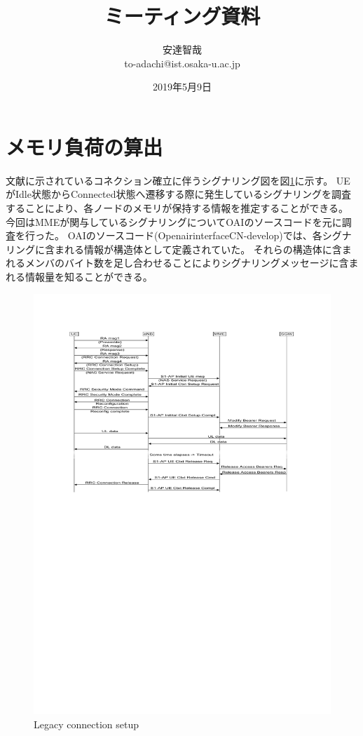 \documentclass[a4j]{ujarticle}
\title{ミーティング資料}
\author{安達智哉\\to-adachi@ist.osaka-u.ac.jp}
\date{2019年5月9日}
\begin{document}
\maketitle

\section{メモリ負荷の算出}
文献\cite{3gpp.23.720}に示されているコネクション確立に伴うシグナリング図を図\ref{Legacy_connection_setup}に示す。
UEがIdle状態からConnected状態へ遷移する際に発生しているシグナリングを調査することにより、各ノードのメモリが保持する情報を推定することができる。
今回はMMEが関与しているシグナリングについてOAIのソースコードを元に調査を行った。
OAIのソースコード(OpenairinterfaceCN-develop)では、各シグナリングに含まれる情報が構造体として定義されていた。
それらの構造体に含まれるメンバのバイト数を足し合わせることによりシグナリングメッセージに含まれる情報量を知ることができる。

\begin{figure}[htbp]
  \centering
  \includegraphics[width=0.9\hsize]{Legacy_connection_setup.pdf}
  \caption{Legacy connection setup}
  \label{Legacy_connection_setup}
\end{figure}
\end{document}
